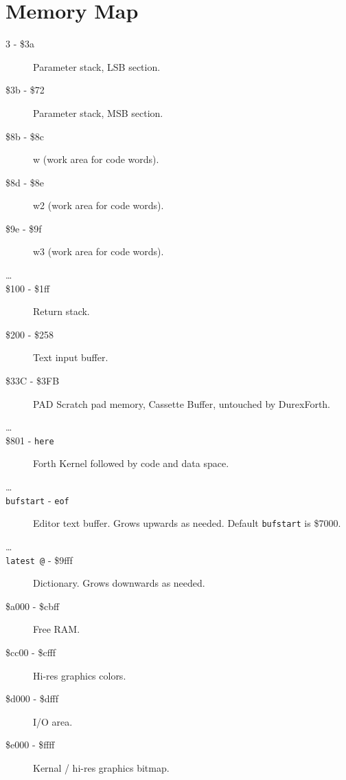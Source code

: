\chapter{Memory Map}

\begin{description}
\item[3 - \$3a] Parameter stack, LSB section.
\item[\$3b - \$72] Parameter stack, MSB section.
\item[\$8b - \$8c] w (work area for code words).
\item[\$8d - \$8e] w2 (work area for code words).
\item[\$9e - \$9f] w3 (work area for code words).
\item[\ldots]
\item[\$100 - \$1ff] Return stack.
\item[\$200 - \$258] Text input buffer.
\item[\$33C - \$3FB] PAD Scratch pad memory, Cassette Buffer, untouched by DurexForth. 
\item[\ldots]
\item[\$801 - \texttt{here}] Forth Kernel followed by code and data space.
\item[\ldots]
\item[\texttt{bufstart} - \texttt{eof}] Editor text buffer. Grows upwards as needed. Default \texttt{bufstart} is \$7000.
\item[\ldots]
\item[\texttt{latest @} - \$9fff] Dictionary. Grows downwards as needed.
\item[\$a000 - \$cbff] Free RAM.
\item[\$cc00 - \$cfff] Hi-res graphics colors.
\item[\$d000 - \$dfff] I/O area. 
\item[\$e000 - \$ffff] Kernal / hi-res graphics bitmap.

\end{description}


